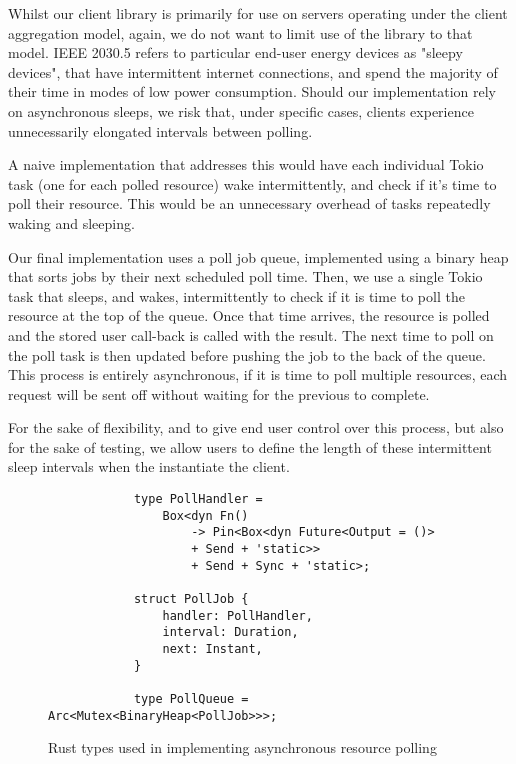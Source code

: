 Whilst our client library is primarily for use on servers operating under the client aggregation model, again, we do not want to limit use of the library to that model. IEEE 2030.5 refers to particular end-user energy devices as "sleepy devices", that have intermittent internet connections, and spend the majority of their time in modes of low power consumption. Should our implementation rely on asynchronous sleeps, we risk that, under specific cases, clients experience unnecessarily elongated intervals between polling.

A naive implementation that addresses this would have each individual Tokio task (one for each polled resource) wake intermittently, and check if it's time to poll their resource. This would be an unnecessary overhead of tasks repeatedly waking and sleeping.

Our final implementation uses a poll job queue, implemented using a binary heap that sorts jobs by their next scheduled poll time. Then, we use a single Tokio task that sleeps, and wakes, intermittently to check if it is time to poll the resource at the top of the queue. Once that time arrives, the resource is polled and the stored user call-back is called with the result. The next time to poll on the poll task is then updated before pushing the job to the back of the queue. This process is entirely asynchronous, if it is time to poll multiple resources, each request will be sent off without waiting for the previous to complete. 

For the sake of flexibility, and to give end user control over this process, but also for the sake of testing, we allow users to define the length of these intermittent sleep intervals when the instantiate the client.

\begin{figure}[h]
    \begin{center}
        \begin{lstlisting}
            type PollHandler =
                Box<dyn Fn() 
                    -> Pin<Box<dyn Future<Output = ()> 
                    + Send + 'static>> 
                    + Send + Sync + 'static>;

            struct PollJob {
                handler: PollHandler,
                interval: Duration,
                next: Instant,
            }

            type PollQueue = Arc<Mutex<BinaryHeap<PollJob>>>;

        \end{lstlisting}
        \label{fig:pollimplds}
        \vspace{-10pt}
        \caption{Rust types used in implementing asynchronous resource polling}
    \end{center}
\end{figure}

